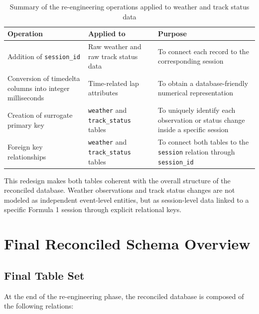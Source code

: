 \documentclass[12pt,a4paper]{article}
\begin{document}
	
	\begin{table}[H]
    	\centering
    	\caption{Summary of the re-engineering operations applied to weather and track status data}
		\renewcommand{\arraystretch}{1.2}
		\begin{tabularx}{\textwidth}{>{\raggedright\arraybackslash}p{4.2cm} >{\raggedright\arraybackslash}p{3.0cm} >{\raggedright\arraybackslash}X}
			\toprule
			\textbf{Operation} & \textbf{Applied to} & \textbf{Purpose} \\
			\midrule
			Addition of \texttt{session\_id} & Raw weather and raw track status data & To connect each record to the corresponding session  \\
			\addlinespace
			Conversion of timedelta columns into integer milliseconds & Time-related lap attributes & To obtain a database-friendly numerical representation  \\
			\addlinespace
			Creation of surrogate primary key & \texttt{weather} and \texttt{track\_status} tables & To uniquely identify each observation or status change inside a specific session \\
			\addlinespace
			Foreign key relationships & \texttt{weather} and \texttt{track\_status} tables & To connect both tables to the \texttt{session} relation through \texttt{session\_id} \\
			\bottomrule
		\end{tabularx}
	\end{table}
	
	This redesign makes both tables coherent with the overall structure of the reconciled database.
	Weather observations and track status changes are not modeled as independent event-level entities, but as session-level data linked to a specific Formula 1 session through explicit relational keys.
	
	\section{Final Reconciled Schema Overview}
	
	\subsection{Final Table Set}
	
	At the end of the re-engineering phase, the reconciled database is composed of the following relations:
\end{document}
